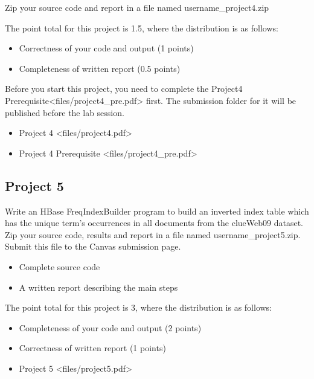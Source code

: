 Zip your source code and report in a file named username\_project4.zip

The point total for this project is 1.5, where the distribution is as
follows:

\begin{itemize}

\item
  Correctness of your code and output (1 points)
\item
  Completeness of written report (0.5 points)
\end{itemize}

Before you start this project, you need to complete the
Project4 Prerequisite\textless{}files/project4\_pre.pdf\textgreater{}
first. The submission folder for it will be published before the lab
session.

\begin{itemize}

\item
  Project 4 \textless{}files/project4.pdf\textgreater{}
\item
  Project 4 Prerequisite \textless{}files/project4\_pre.pdf\textgreater{}
\end{itemize}

\subsection{Project 5}\label{project-5}

Write an HBase FreqIndexBuilder program to build an inverted index table
which has the unique term's occurrences in all documents from the
clueWeb09 dataset. Zip your source code, results and report in a file
named username\_project5.zip. Submit this file to the Canvas submission
page.

\begin{itemize}

\item
  Complete source code
\item
  A written report describing the main steps
\end{itemize}

The point total for this project is 3, where the distribution is as
follows:

\begin{itemize}

\item
  Completeness of your code and output (2 points)
\item
  Correctness of written report (1 points)
\item
  Project 5 \textless{}files/project5.pdf\textgreater{}
\end{itemize}

